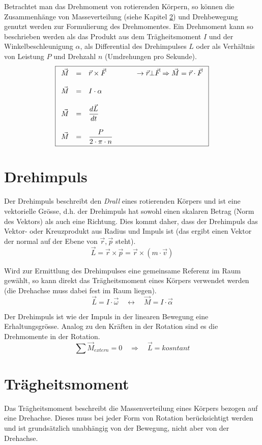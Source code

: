 Betrachtet man das Drehmoment von rotierenden Körpern, so können die
Zusammenhänge von Masseverteilung (siehe Kapitel 
\ref{sec:traegheitsmoment}) und Drehbewegung genutzt werden zur
Formulierung des Drehmomentes. Ein Drehmoment kann so beschrieben werden
als das Produkt aus dem Trägheitsmoment $I$ und der Winkelbeschleunigung
$\alpha$, als Differential des Drehimpulses $L$ oder als Verhältnis von 
Leistung $P$ und Drehzahl $n$ (Umdrehungen pro Sekunde).
\[ \boxed{\begin{array}{r c l}
	\vec{M}
		&=& \displaystyle \vec{r} \times \vec{F}
			\qquad \qquad \rightarrow \vec{r} \bot \vec{F} 
			\Rightarrow \vec{M} = \vec{r} \cdot \vec{F} \\
	& & \\
	\vec{M} 
		&=& \displaystyle I \cdot \alpha \\
	& & \\
	\vec{M} 
		&=& \displaystyle \frac{d\vec{L}}{dt} \\
	& & \\
	\vec{M} 
		&=& \displaystyle \frac{P}{2 \cdot \pi \cdot n}
\end{array} }\]

\section{Drehimpuls}
Der Drehimpuls beschreibt den \textit{Drall} eines rotierenden Körpers
und ist eine vektorielle Grösse, d.h. der Drehimpuls hat sowohl einen
skalaren Betrag (Norm des Vektors) als auch eine Richtung. Dies kommt
daher, dass der Drehimpuls das Vektor- oder Kreuzprodukt aus Radius und
Impuls ist (das ergibt einen Vektor der normal auf der Ebene von 
$\vec{r},\vec{p}$ steht).
\[ \boxed{
	\vec{L}
		= \vec{r} \times \vec{p}
		= \vec{r} \times(m \cdot \vec{v})
}\]

\noindent
Wird zur Ermittlung des Drehimpulses eine gemeinsame Referenz im Raum
gewählt, so kann direkt das Trägheitsmoment eines Körpers verwendet
werden (die Drehachse muss dabei fest im Raum liegen).
\[ \boxed{
	\vec{L} = I \cdot \vec{\omega} 
	\quad \leftrightarrow \quad
	\vec{M} = I \cdot \vec{\alpha}
} \]

\noindent
Der Drehimpuls ist wie der Impuls in der linearen Bewegung eine 
Erhaltungsgrösse. Analog zu den Kräften in der Rotation 
sind es die Drehmomente in der Rotation. 
\[ \boxed{
	\sum \vec{M}_{extern} = 0 
	\quad \Rightarrow \quad 
	\vec{L} = kosntant
} \]

\section{Trägheitsmoment}\label{sec:traegheitsmoment}
Das Trägheitsmoment beschreibt die Massenverteilung eines Körpers
bezogen auf eine Drehachse. Dieses muss bei jeder Form von Rotation
berücksichtigt werden und ist grundsätzlich unabhängig von der 
Bewegung, nicht aber von der Drehachse.

